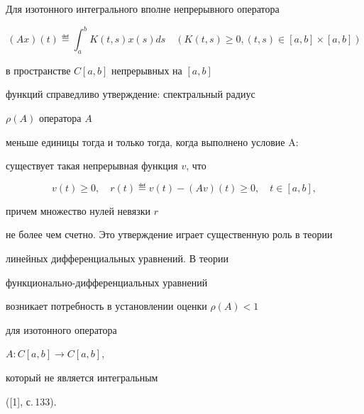 \date{}







\pagestyle{plain} %







\maketitle


\label{begin}








Для изотонного интегрального вполне непрерывного оператора


$$


(Ax)(t)\eqdef \int_a^b K(t,s) x(s) ds\quad


(K(t,s)\geq 0, (t,s)\in[a,b]\times[a,b])


$$


в пространстве $C[a,b]$ непрерывных на $[a,b]$


функций справедливо утверждение: спектральный радиус


$\rho(A)$ оператора $A$


меньше единицы тогда и только тогда, когда выполнено условие A:


существует такая непрерывная функция $v$, что


$$


v(t)\geq 0,\quad r(t)\eqdef v(t) - (Av)(t) \geq 0,\quad t\in[a,b],


$$


причем множество нулей невязки $r$


не более чем счетно. Это утверждение играет существенную роль в теории


линейных дифференциальных уравнений. В теории 


функционально-дифференциальных уравнений


возникает потребность в установлении оценки $\rho(A)<1$


для изотонного оператора


$A:C[a,b]\to C[a,b]$,


который не является интегральным


([1], с.\,133).


